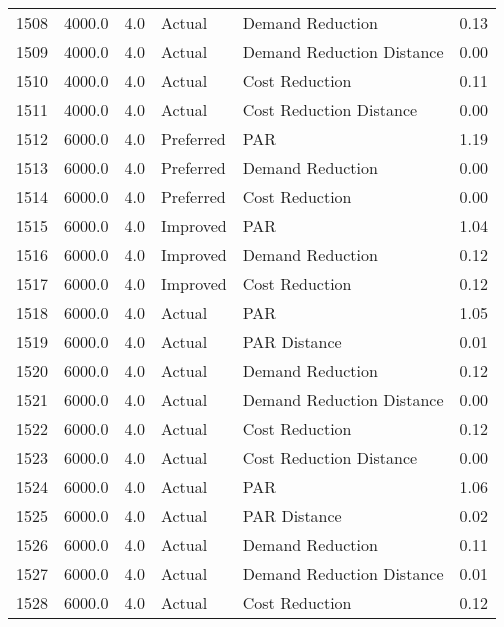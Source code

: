 \begin{longtable}{lrrllr}
1508 &       4000.0 &     4.0 &         Actual &           Demand Reduction &   0.13 \\
1509 &       4000.0 &     4.0 &         Actual &  Demand Reduction Distance &   0.00 \\
1510 &       4000.0 &     4.0 &         Actual &             Cost Reduction &   0.11 \\
1511 &       4000.0 &     4.0 &         Actual &    Cost Reduction Distance &   0.00 \\
1512 &       6000.0 &     4.0 &      Preferred &                        PAR &   1.19 \\
1513 &       6000.0 &     4.0 &      Preferred &           Demand Reduction &   0.00 \\
1514 &       6000.0 &     4.0 &      Preferred &             Cost Reduction &   0.00 \\
1515 &       6000.0 &     4.0 &       Improved &                        PAR &   1.04 \\
1516 &       6000.0 &     4.0 &       Improved &           Demand Reduction &   0.12 \\
1517 &       6000.0 &     4.0 &       Improved &             Cost Reduction &   0.12 \\
1518 &       6000.0 &     4.0 &         Actual &                        PAR &   1.05 \\
1519 &       6000.0 &     4.0 &         Actual &               PAR Distance &   0.01 \\
1520 &       6000.0 &     4.0 &         Actual &           Demand Reduction &   0.12 \\
1521 &       6000.0 &     4.0 &         Actual &  Demand Reduction Distance &   0.00 \\
1522 &       6000.0 &     4.0 &         Actual &             Cost Reduction &   0.12 \\
1523 &       6000.0 &     4.0 &         Actual &    Cost Reduction Distance &   0.00 \\
1524 &       6000.0 &     4.0 &         Actual &                        PAR &   1.06 \\
1525 &       6000.0 &     4.0 &         Actual &               PAR Distance &   0.02 \\
1526 &       6000.0 &     4.0 &         Actual &           Demand Reduction &   0.11 \\
1527 &       6000.0 &     4.0 &         Actual &  Demand Reduction Distance &   0.01 \\
1528 &       6000.0 &     4.0 &         Actual &             Cost Reduction &   0.12 \\

\end{longtable}
